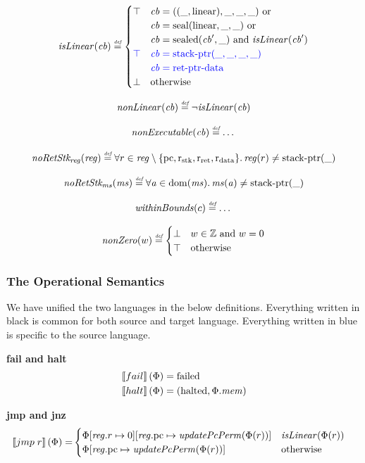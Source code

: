 \documentclass[a4paper]{article}
\newcommand{\defeq}{\stackrel{\textit{\tiny{def}}}{=}}
\newcommand{\sem}[1]{\left\llbracket #1 \right\rrbracket}
\newcommand{\dom}{\mathrm{dom}}
\newcommand{\tand}{\text{ and }}
\newcommand{\tor}{\text{ or }}
\newcommand{\totherwise}{\text{otherwise }}
\newcommand{\sourcecolor}[1]{\color{blue}}
\newcommand{\src}[1]{{\sourcecolor{} #1}}
\newcommand{\targetcolor}[1]{\color{black}}
\newcommand{\trg}[1]{{\targetcolor{} #1}}
\newcommand{\zinstr}[1]{#1}
\newcommand{\oneinstr}[2]{
  \ifthenelse{\equal{#2}{}}
  {\zinstr{#1}}
  {\zinstr{#1} \; #2}
}
\newcommand{\tfail}{\zinstr{\trg{fail}}}
\newcommand{\thalt}{\zinstr{\trg{halt}}}
\newcommand{\tjmp}[1]{\oneinstr{\trg{jmp}}{#1}}
\newcommand{\ints}{\mathbb{Z}}
\newcommand{\update}[2]{[#1 \mapsto #2]}
\newcommand{\updReg}[2]{\update{\reg.#1}{#2}}
\newcommand{\shareddom}[1]{\mathrm{#1}}
\newcommand{\stkptr}[1]{\mathrm{stack\text{-}ptr}(#1)}
\newcommand{\retptrd}{\mathrm{ret\text{-}ptr\text{-}data}}
\newcommand{\seal}[1]{\shareddom{seal}(#1)}
\newcommand{\sealed}[1]{\shareddom{sealed}(#1)}
\newcommand{\failed}{\mathrm{failed}}
\newcommand{\halted}{\mathrm{halted}}
\newcommand{\var}[1]{\mathit{#1}}
\newcommand{\reg}{\var{reg}}
\newcommand{\mem}{\var{mem}}
\newcommand{\ms}{\var{ms}}
\newcommand{\cb}{\var{cb}}
\newcommand{\aaddr}{\var{a}}
\newcommand{\pcreg}{\mathrm{pc}}
\newcommand{\rstk}{\mathrm{r}_\mathrm{stk}}
\newcommand{\rO}{\mathrm{r}_\mathrm{ret}}
\newcommand{\rret}{\rO}
\newcommand{\rdata}{\mathrm{r}_\mathrm{data}}
\newcommand{\plainlinearity}[1]{\mathrm{#1}}
\newcommand{\linear}{\plainlinearity{linear}}
\newcommand{\plainfun}[2]{
  \ifthenelse{\equal{#2}{}}
  {\mathit{#1}}
  {\mathit{#1}(#2)}
}
\newcommand{\updPcPerm}[1]{\plainfun{updatePcPerm}{#1}}
\newcommand{\nonExec}[1]{\plainfun{nonExecutable}{#1}}
\newcommand{\nonLinear}[1]{\plainfun{nonLinear}{#1}}
\newcommand{\isLinear}[1]{\plainfun{isLinear}{#1}}
\newcommand{\noRetStkReg}[1]{\plainfun{noRetStk_{reg}}{#1}}
\newcommand{\noRetStkMs}[1]{\plainfun{noRetStk_{ms}}{#1}}
\newcommand{\withinBounds}[1]{\plainfun{withinBounds}{#1}}
\newcommand{\nonZero}[1]{\plainfun{nonZero}{#1}}
\begin{document}
\[
  \isLinear{\cb} \defeq
  \begin{cases}
    \top & 
    \arraycolsep=0pt
    \begin{array}[t]{l}
      \cb = ((\_,\linear),\_,\_,\_) \tor\\
      \cb = \seal{\linear,\_,\_} \tor\\
      \cb = \sealed{\cb',\_} \tand \isLinear{\cb'} 
    \end{array}\\
    \src{\top} & 
    \arraycolsep=0pt
    \begin{array}[t]{l}
      \src{\cb = \stkptr{\_,\_,\_,\_}}\\
      \src{\cb = \retptrd{}}
    \end{array}\\
    \bot & \totherwise
  \end{cases}
\]

\[
  \nonLinear{\cb} \defeq \neg \isLinear{\cb}
\]

\[
  \nonExec{\cb} \defeq \dots
\]


\[
  \noRetStkReg{\reg} \defeq \forall r \in \reg \setminus \{ \pcreg, \rstk, \rret, \rdata \} \ldotp \reg(r) \neq \stkptr{\_}
\]

\[
  \noRetStkMs{\ms} \defeq \forall \aaddr \in \dom(\ms) \ldotp \ms(\aaddr) \neq \stkptr{\_}
\]

\[
  \withinBounds{c} \defeq \dots
\]

\[
  \nonZero{w} \defeq
  \begin{cases}
    \bot & w \in \ints \tand w = 0 \\
    \top & \totherwise
  \end{cases}
\]

\subsubsection{The Operational Semantics}
We have unified the two languages in the below definitions. Everything written in black is common for both source and target language. Everything written in \src{blue} is specific to the source language.

\noindent\textbf{fail and halt}\\
\begin{align*}
  \sem{\tfail}(\Phi) = & \; \failed \\
  \sem{\thalt}(\Phi) = & \; (\halted, \Phi.\mem)
\end{align*}

\noindent\textbf{jmp and jnz}\\
\begin{align*}
  \sem{\tjmp{r}}(\Phi) = &  
                     \begin{cases}
                       \Phi\updReg{r}{0}\updReg{\pcreg}{\updPcPerm{\Phi(r)}} & \isLinear{\Phi(r)} \\
                       \Phi\updReg{\pcreg}{\updPcPerm{\Phi(r)}} & \totherwise
                     \end{cases}
\end{align*}
\end{document}
